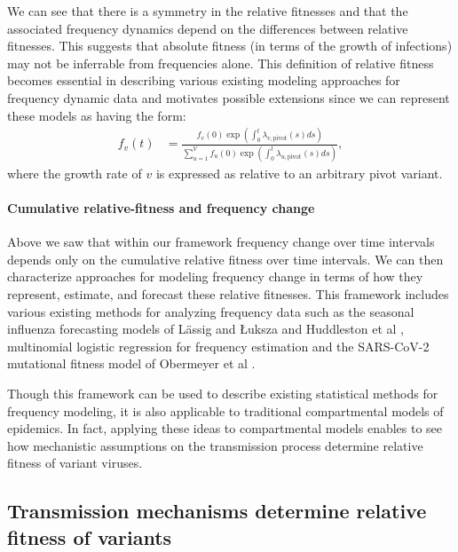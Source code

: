\documentclass[12pt,oneside,letterpaper]{article}
\begin{document}
We can see that there is a symmetry in the relative fitnesses and that the associated frequency dynamics depend on the differences between relative fitnesses.
This suggests that absolute fitness (in terms of the growth of infections) may not be inferrable from frequencies alone.
This definition of relative fitness becomes essential in describing various existing modeling approaches for frequency dynamic data and motivates possible extensions since we can represent these models as having the form:
\begin{align}
    f_{v}(t) &= \frac{ f_{v}(0) \exp( \int_{0}^{t} \lambda_{v, \text{pivot}}(s) ds)}{\sum_{u=1}^{V}  f_{u}(0) \exp( \int_{0}^{t} \lambda_{u, \text{pivot}}(s) ds)},
\end{align}
where the growth rate of $v$ is expressed as relative to an arbitrary pivot variant.

\paragraph{Cumulative relative-fitness and frequency change}

Above we saw that within our framework frequency change over time intervals depends only on the cumulative relative fitness over time intervals.
We can then characterize approaches for modeling frequency change in terms of how they represent, estimate, and forecast these relative fitnesses.
This framework includes various existing methods for analyzing frequency data such as the seasonal influenza forecasting models of L{\"a}ssig and {\L}uksza \cite{luksza2014predictive} and Huddleston et al \cite{Huddleston2020}, multinomial logistic regression for frequency estimation \cite{Annavajhala2021} and the SARS-CoV-2 mutational fitness model of Obermeyer et al \cite{Obermeyer2022}.

Though this framework can be used to describe existing statistical methods for frequency modeling, it is also applicable to traditional compartmental models of epidemics.
In fact, applying these ideas to compartmental models enables to see how mechanistic assumptions on the transmission process determine relative fitness of variant viruses.

\subsection*{Transmission mechanisms determine relative fitness of variants}
\end{document}
